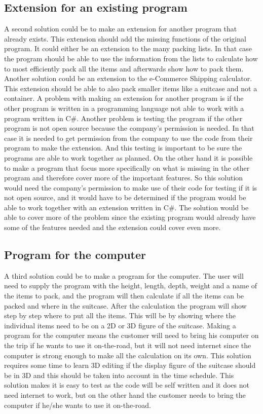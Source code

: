 \subsection{Extension for an existing program}
A second solution could be to make an extension for another program that already exists. This extension should add the missing functions of the original program. It could either be an extension to the many packing lists. In that case the program should be able to use the information from the lists to calculate how to most efficiently pack all the items and afterwards show how to pack them. Another solution could be an extension to the e-Commerce Shipping calculator. This extension should be able to also pack smaller items like a suitcase and not a container. A problem with making an extension for another program is if the other program is written in a programming language not able to work with a program written in C#. Another problem is testing the program if the other program is not open source because the company's permission is needed. In that case it is needed to get permission from the company to use the code from their program to make the extension. And this testing is important to be sure the programs are able to work together as planned. On the other hand it is possible to make a program that focus more specifically on what is missing in the other program and therefore cover more of the important features. So this solution would need the company’s permission to make use of their code for testing if it is not open source, and it would have to be determined if the program would be able to work together with an extension written in C#. The solution would be able to cover more of the problem since the existing program would already have some of the features needed and the extension could cover even more.
\newline
\subsection{Program for the computer}
A third solution could be to make a program for the computer. The user will need to supply the program with the height, length, depth, weight and a name of the items to pack, and the program will then calculate if all the items can be packed and where in the suitcase. After the calculation the program will show step by step where to put all the items. This will be by showing where the individual items need to be on a 2D or 3D figure of the suitcase. Making a program for the computer means the customer will need to bring his computer on the trip if he wants to use it on-the-road, but it will not need internet since the computer is strong enough to make all the calculation on its own. This solution requires some time to learn 3D editing if the display figure of the suitcase should be in 3D and this should be taken into account in the time schedule.  This solution makes it is easy to test as the code will be self written and it does not need internet to work, but on the other hand the customer needs to bring the computer if he/she wants to use it on-the-road.  
\newline
